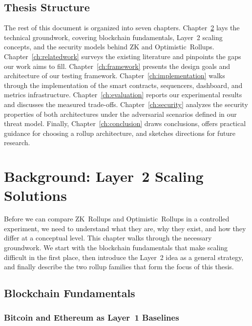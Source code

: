 \documentclass[
]{elteikthesis}[2024/04/26]
\begin{document}
\section{Thesis Structure}

The rest of this document is organized into seven chapters. Chapter~\ref{ch:background} lays the technical groundwork, covering blockchain fundamentals, Layer~2 scaling concepts, and the security models behind ZK and Optimistic~Rollups. Chapter~\ref{ch:relatedwork} surveys the existing literature and pinpoints the gaps our work aims to fill. Chapter~\ref{ch:framework} presents the design goals and architecture of our testing framework. Chapter~\ref{ch:implementation} walks through the implementation of the smart contracts, sequencers, dashboard, and metrics infrastructure. Chapter~\ref{ch:evaluation} reports our experimental results and discusses the measured trade-offs. Chapter~\ref{ch:security} analyzes the security properties of both architectures under the adversarial scenarios defined in our threat model. Finally, Chapter~\ref{ch:conclusion} draws conclusions, offers practical guidance for choosing a rollup architecture, and sketches directions for future research.

\cleardoublepage

\chapter{Background: Layer~2 Scaling Solutions}
\label{ch:background}

Before we can compare ZK~Rollups and Optimistic~Rollups in a controlled experiment, we need to understand what they are, why they exist, and how they differ at a conceptual level. This chapter walks through the necessary groundwork. We start with the blockchain fundamentals that make scaling difficult in the first place, then introduce the Layer~2 idea as a general strategy, and finally describe the two rollup families that form the focus of this thesis.

\section{Blockchain Fundamentals}

\subsection{Bitcoin and Ethereum as Layer~1 Baselines}
\end{document}
